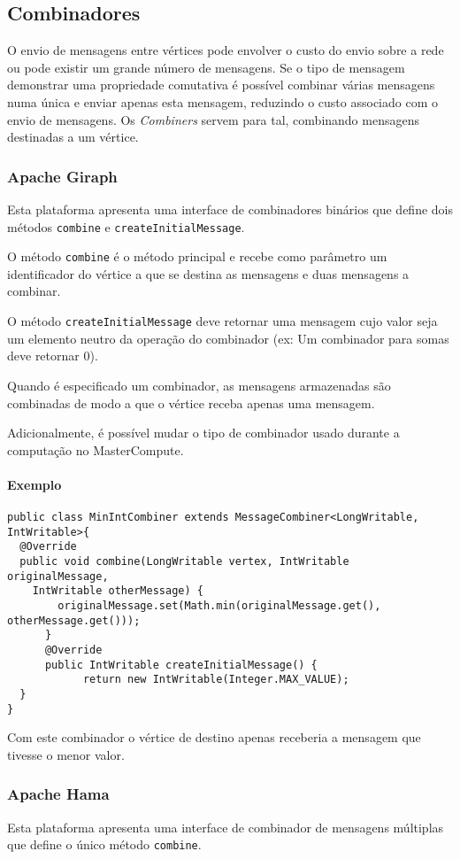 \subsection{Combinadores}
O envio de mensagens entre vértices pode envolver o custo do envio sobre a rede ou pode existir um grande número de mensagens. Se o tipo de mensagem demonstrar uma propriedade comutativa é possível combinar várias mensagens numa única e enviar apenas esta mensagem, reduzindo o custo associado com o envio de mensagens. Os \textit{Combiners} servem para tal, combinando mensagens destinadas a um vértice.

\subsubsection*{Apache Giraph}
Esta plataforma apresenta uma interface de combinadores binários que define dois métodos \texttt{combine} e \texttt{createInitialMessage}.

O método \texttt{combine} é o método principal e recebe como parâmetro um identificador do vértice a que se destina as mensagens e duas mensagens a combinar.

O método \texttt{createInitialMessage} deve retornar uma mensagem cujo valor seja um elemento neutro da operação do combinador (ex: Um combinador para somas deve retornar 0).

Quando é especificado um combinador, as mensagens armazenadas são combinadas de modo a que o vértice receba apenas uma mensagem.

Adicionalmente, é possível mudar o tipo de combinador usado durante a computação no MasterCompute.

\paragraph{Exemplo}
\begin{verbatim}
public class MinIntCombiner extends MessageCombiner<LongWritable, IntWritable>{
  @Override
  public void combine(LongWritable vertex, IntWritable originalMessage,
	IntWritable otherMessage) {
	    originalMessage.set(Math.min(originalMessage.get(), otherMessage.get()));
	  }
	  @Override
	  public IntWritable createInitialMessage() {
		    return new IntWritable(Integer.MAX_VALUE);
  }
}
\end{verbatim}

Com este combinador o vértice de destino apenas receberia a mensagem que 
tivesse o menor valor.

\subsubsection*{Apache Hama}
Esta plataforma apresenta uma interface de combinador de mensagens múltiplas que define o único método \texttt{combine}.

